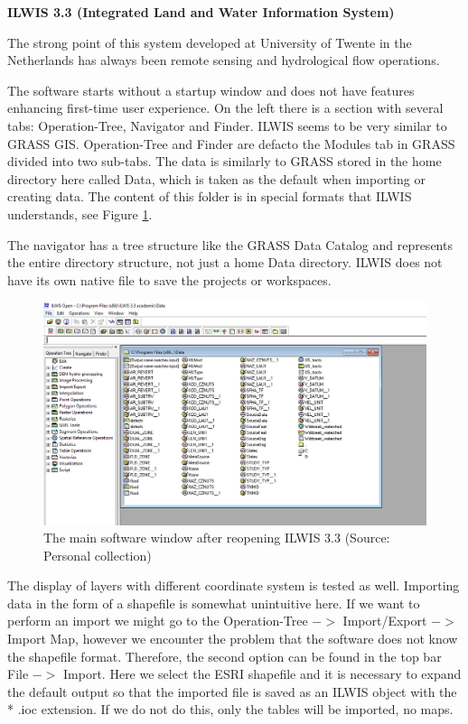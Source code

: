 \documentclass[a4paper,10pt,twoside]{article}
\begin{document}
\newpage
\vspace*{-1cm} 
\bigskip
\noindent \textbf {ILWIS 3.3 (Integrated Land and Water Information System)}

\noindent The strong point of this system developed at University of Twente in the Netherlands has always been remote sensing and hydrological flow operations.

The software starts without a startup window and does not have features enhancing first-time user experience. On the left there is a section with several tabs: Operation-Tree, Navigator and Finder. ILWIS seems to be very similar to GRASS GIS. Operation-Tree and Finder are defacto the Modules tab in GRASS divided into two sub-tabs.  The data is similarly to GRASS stored in the home directory here called Data, which is taken as the default when importing or creating data. The content of this folder is in special formats that ILWIS understands, see Figure \ref{fig:ilwis_uvodni_okno}. 

The navigator has a tree structure like the GRASS Data Catalog and represents the entire directory structure, not just a home Data directory. ILWIS does not have its own native file to save the projects or workspaces.

\vspace{0.3cm}
\begin{figure}[hbt!] 
\begin{center}
\includegraphics[width=17cm]{../pictures/ilwis_uvodni_okno.png} 
\caption[The main software window after reopening ILWIS 3.3]{The main software window after reopening ILWIS 3.3 (Source: Personal collection)}
\label{fig:ilwis_uvodni_okno}
\end{center}
\end{figure}

\noindent The display of layers with different coordinate system is tested as well. Importing data in the form of a shapefile is somewhat unintuitive here. If we want to perform an import we might go to the Operation-Tree $->$ Import/Export $->$ Import Map, however we encounter the problem that the software does not know the shapefile format. Therefore, the second option can be found in the top bar File $->$ Import. Here we select the ESRI shapefile and it is necessary to expand the default output so that the imported file is saved as an ILWIS object with the * .ioc extension. If we do not do this, only the tables will be imported, no maps.
\end{document}
